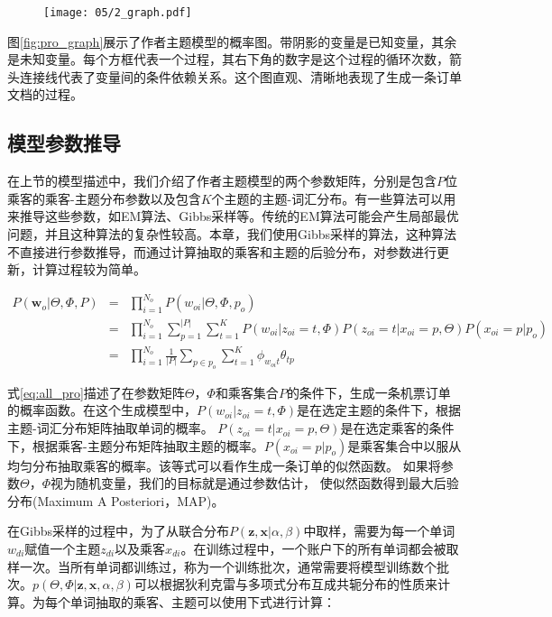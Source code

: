 \begin{figure}[!h]
 \centering
 \texttt{[image: 05/2\_graph.pdf]}
\end{figure}

图\ref{fig:pro_graph}展示了作者主题模型的概率图。带阴影的变量是已知变量，其余是未知变量。每个方框代表一个过程，其右下角的数字是这个过程的循环次数，箭头连接线代表了变量间的条件依赖关系。这个图直观、清晰地表现了生成一条订单文档的过程。

\subsection{模型参数推导}
在上节的模型描述中，我们介绍了作者主题模型的两个参数矩阵，分别是包含$P$位乘客的乘客-主题分布参数以及包含$K$个主题的主题-词汇分布。有一些算法可以用来推导这些参数，如EM算法、Gibbs采样\cite{ishwaran2011gibbs}等。传统的EM算法可能会产生局部最优问题，并且这种算法的复杂性较高。本章，我们使用Gibbs采样的算法，这种算法不直接进行参数推导，而通过计算抽取的乘客和主题的后验分布，对参数进行更新，计算过程较为简单。


\begin{eqnarray}
\label{eq:all_pro}
P(\mathbf{w}_o | \Theta,\Phi,P) & = & \prod_{i=1}^{N_o}P(w_{oi}|\Theta,\Phi,p_o) 
\nonumber \\
 & = & \prod_{i=1}^{N_o}\sum_{p=1}^{|P|}\sum_{t=1}^{K}P(w_{oi}|z_{oi}=t,\Phi)
P(z_{oi}=t|x_{oi}=p,\Theta)P(x_{oi}=p|p_o) \nonumber \\
 & = & \prod_{i=1}^{N_o}\frac{1}{|P|}\sum_{p \in p_o}\sum_{t=1}^{K}\phi_{w_{oi}t}\theta_{tp}
\end{eqnarray}


式\ref{eq:all_pro}描述了在参数矩阵$\Theta$，$\Phi$和乘客集合$P$的条件下，生成一条机票订单的概率函数。在这个生成模型中，$P(w_{oi}|z_{oi}=t,\Phi)$是在选定主题的条件下，根据主题-词汇分布矩阵抽取单词的概率。
$P(z_{oi}=t|x_{oi}=p,\Theta)$是在选定乘客的条件下，根据乘客-主题分布矩阵抽取主题的概率。$P(x_{oi}=p|p_o)$是乘客集合中以服从均匀分布抽取乘客的概率。该等式可以看作生成一条订单的似然函数。
如果将参数$\Theta$，$\Phi$视为随机变量，我们的目标就是通过参数估计，
使似然函数得到最大后验分布(Maximum A Posteriori，MAP)。 

在Gibbs采样的过程中，为了从联合分布$P(\mathbf{z},\mathbf{x}|\alpha,\beta)$中取样，需要为每一个单词$w_{di}$赋值一个主题$z_{di}$以及乘客$x_{di}$。在训练过程中，一个账户下的所有单词都会被取样一次。当所有单词都训练过，称为一个训练批次，通常需要将模型训练数个批次。$p(\Theta,\Phi|\mathbf{z},\mathbf{x},\alpha,\beta)$可以根据狄利克雷与多项式分布互成共轭分布的性质来计算。为每个单词抽取的乘客、主题可以使用下式进行计算：

